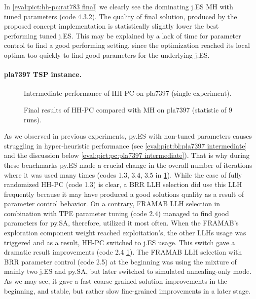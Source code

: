 In \cref{eval:pict:hh-pc:rat783 final} we clearly see the dominating j.ES MH with tuned parameters (code 4.3.2). The quality of final solution, produced by the proposed concept implementation is statistically slightly lower the best performing tuned j.ES. This may be explained by a lack of time for parameter control to find a good performing setting, since the optimization reached its local optima too quickly to find good parameters for the underlying j.ES.


\paragraph{pla7397 TSP instance.}
\begin{figure}[t]
	\centering
	\vspace{-20pt}
	
	\caption{Intermediate performance of HH-PC on pla7397 (single experiment).}
	\vspace{-5pt}
	\label{eval:pict:hh-pc:pla7397 intermediate}
\end{figure}

\begin{figure}[t]
	\centering
	\vspace{-20pt}
	
	\caption{Final results of HH-PC compared with MH on pla7397 (statistic of 9 runs).}
	\vspace{-5pt}
	\label{eval:pict:hh-pc:pla7397 final}
\end{figure}

As we observed in previous experiments, py.ES with non-tuned parameters causes struggling in hyper-heuristic performance (see \cref{eval:pict:bl:pla7397 intermediate} and the discussion below \cref{eval:pict:pc:pla7397 intermediate}). That is why during these benchmarks py.ES made a crucial change in the overall number of iterations where it was used many times (codes 1.3, 3.4, 3.5 in \cref{eval:pict:hh-pc:pla7397 intermediate}). While the case of fully randomized HH-PC (code 1.3) is clear, a BRR LLH selection did use this LLH frequently because it may have produced a good solutions quality as a result of parameter control behavior. On a contrary, FRAMAB LLH selection in combination with TPE parameter tuning (code 2.4) managed to find good parameters for py.SA, therefore, utilized it most often. When the FRAMAB's exploration component weight reached exploitation's, the other LLHs usage was triggered and as a result, HH-PC switched to j.ES usage. This switch gave a dramatic result improvements (code 2.4 \cref{eval:pict:hh-pc:pla7397 intermediate}). The FRAMAB LLH selection with BRR parameter control (code 2.5) at the beginning was using the mixture of mainly two j.ES and py.SA, but later switched to simulated annealing-only mode. As we may see, it gave a fast coarse-grained solution improvements in the beginning, and stable, but rather slow fine-grained improvements in a later stage.

